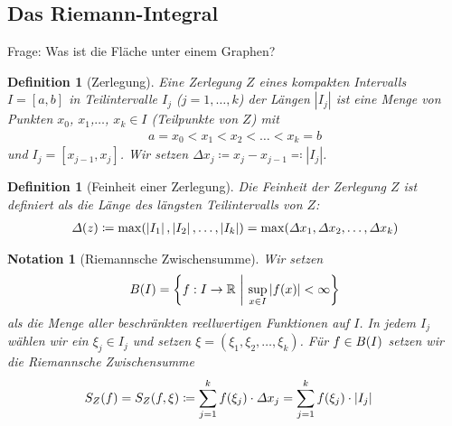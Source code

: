 \documentclass[11pt, twoside, a4paper]{article}
\theoremstyle{plain}
\newtheorem{definition}[blockelement]{Definition}
\newtheorem{notation}[blockelement]{Notation}
\newcommand{\set}[1]{\left\{#1\right\}}
\newcommand{\pair}[1]{\left(#1\right)}
\newcommand{\of}[1]{\mathopen{}\mathclose{}\bgroup\left(#1\aftergroup\egroup\right)}
\newcommand{\abs}[1]{\left\lvert#1\right\rvert}
\newcommand{\interv}[1]{\left[#1\right]}
\newcommand{\fromto}{\rightarrow{}}
\newcommand{\definedas}[0]{\coloneqq}
\newcommand{\definedasbackwards}[0]{\eqqcolon}
\newcommand{\R}{\mathbb{R}}
\begin{document}
    \subsection{Das Riemann-Integral}
    \thispagestyle{pagenumberonly}
    \marginnote{[16. Apr]}
    Frage: Was ist die Fläche unter einem Graphen?
    \begin{definition}[Zerlegung]
        Eine Zerlegung $Z$ eines kompakten Intervalls $I=\interv{a,b}$ in Teilintervalle $I_j$ ($j=1,\dots, k$) der Längen $\abs{I_j}$ ist eine Menge von Punkten $x_0$, $x_1$,$\dots$, $x_k\in I$ (Teilpunkte von $Z$) mit
        \begin{align*}
            a=x_0 < x_1 < x_2 < \dots < x_k = b
        \end{align*}
        und $I_j = \interv{x_{j-1}, x_j}$. Wir setzen $\varDelta x_j \definedas x_j - x_{j-1} \definedasbackwards\abs{I_j}$.
    \end{definition}
    \begin{definition}[Feinheit einer Zerlegung]
        Die Feinheit der Zerlegung $Z$ ist definiert als die Länge des längsten Teilintervalls von $Z$:
        \begin{align*}
            \varDelta\of{z}\definedas \max\of{\abs{I_1}, \abs{I_2}, \dots, \abs{I_k}} = \max\of{\varDelta x_1, \varDelta x_2, \dots, \varDelta x_k}
        \end{align*}
    \end{definition}
    \begin{notation}[Riemannsche Zwischensumme]
        Wir setzen
        \begin{align*}
            B\of{I} = \set{f: I\fromto \R~\middle\vert~\sup_{x\in I} \abs{f(x)} < \infty}
        \end{align*}
        als die Menge aller beschränkten reellwertigen Funktionen auf $I$. In jedem $I_j$ wählen wir ein $\xi_j\in I_j$ und setzen $\xi=\pair{\xi_1, \xi_2, \dots, \xi_k}$. Für $f\in B\of{I}$ setzen wir die Riemannsche Zwischensumme
        \begin{align*}
            S_Z\of{f} &= S_Z\of{f, \xi} \definedas \sum_{j=1}^{k} f\of{\xi_j}\cdot\varDelta x_j = \sum_{j=1}^{k} f\of{\xi_j}\cdot\abs{I_j}
        \end{align*}
    \end{notation}
\end{document}
